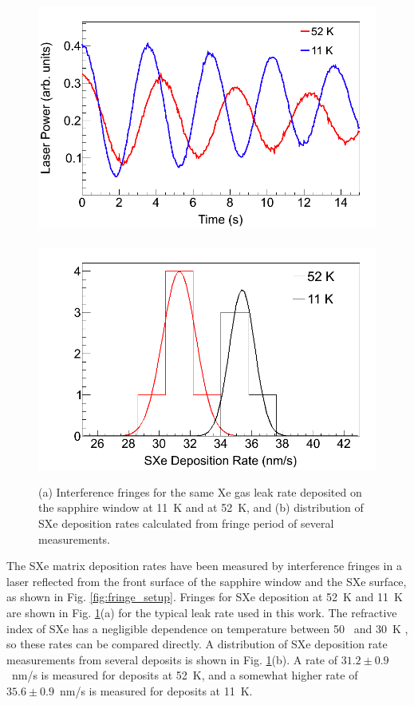 \begin{figure} %
        \centering
                \includegraphics[width=.5\textwidth]{figures/fringes_52K_vs_11K.png}
                ~
                \includegraphics[width=.5\textwidth]{figures/fringes_52K_vs_11K_statistics.png}
                \caption{(a) Interference fringes for the same Xe gas leak rate deposited on the sapphire window at 11~K and at 52~K, and (b) distribution of SXe deposition rates calculated from fringe period of several measurements.}
\label{fig:fringes_52K_vs_11K}
\end{figure}

The SXe matrix deposition rates have been measured by interference fringes in a laser reflected from the front surface of the sapphire window and the SXe surface, as shown in Fig. \ref{fig:fringe_setup}.  Fringes for SXe deposition at 52~K and 11~K are shown in Fig. \ref{fig:fringes_52K_vs_11K}(a) for the typical leak rate used in this work.  The refractive index of SXe has a negligible dependence on temperature between 50~ and 30~K \cite{SXeIndex}, so these rates can be compared directly.  A distribution of SXe deposition rate measurements from several deposits is shown in Fig. \ref{fig:fringes_52K_vs_11K}(b).  A rate of $31.2 \pm 0.9$~nm/s is measured for deposits at 52~K, and a somewhat higher rate of $35.6 \pm 0.9$~nm/s is measured for deposits at 11~K.


